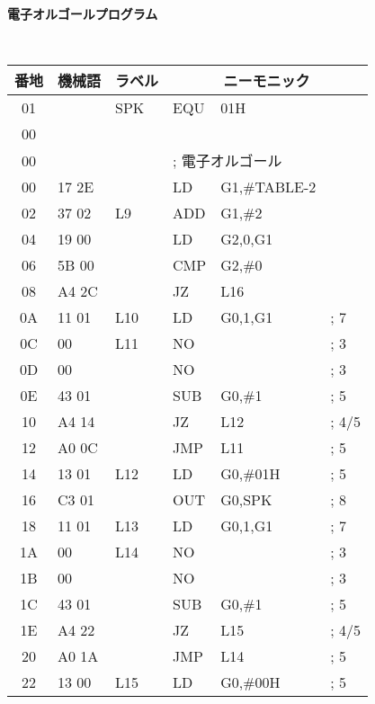\newpage
\begin{center}
{\bf 電子オルゴールプログラム}
\vspace{0.3cm}
{\footnotesize\tt
\begin{tabular}{|c|l|l|l l l|} \hline
番地 & 機械語 & ラベル & \multicolumn{3}{|c|}{ニーモニック} \\
\hline
01 &              &  SPK    & EQU    & 01H         &   \\
00 &              &         &        &             &   \\
00 &              &         & \multicolumn{3}{|l|}{; 電子オルゴール}\\
00 & 17 2E        &         & LD     & G1,\#TABLE-2&   \\
02 & 37 02        &  L9     & ADD    & G1,\#2      &   \\
04 & 19 00        &         & LD     & G2,0,G1     &   \\
06 & 5B 00        &         & CMP    & G2,\#0      &   \\
08 & A4 2C        &         & JZ     & L16         &   \\
0A & 11 01        &  L10    & LD     & G0,1,G1     &   ; 7\\
0C & 00           &  L11    & NO     &             &   ; 3\\
0D & 00           &         & NO     &             &   ; 3\\
0E & 43 01        &         & SUB    & G0,\#1      &   ; 5\\
10 & A4 14        &         & JZ     & L12         &   ; 4/5\\
12 & A0 0C        &         & JMP    & L11         &   ; 5\\
14 & 13 01        &  L12    & LD     & G0,\#01H    &   ; 5\\
16 & C3 01        &         & OUT    & G0,SPK      &   ; 8\\
18 & 11 01        &  L13    & LD     & G0,1,G1     &   ; 7\\
1A & 00           &  L14    & NO     &             &   ; 3\\
1B & 00           &         & NO     &             &   ; 3\\
1C & 43 01        &         & SUB    & G0,\#1      &  ; 5\\
1E & A4 22        &         & JZ     & L15         &   ; 4/5\\
20 & A0 1A        &         & JMP    & L14         &   ; 5\\
22 & 13 00        &  L15    & LD     & G0,\#00H    &   ; 5\\

\end{tabular}}
\end{center}
